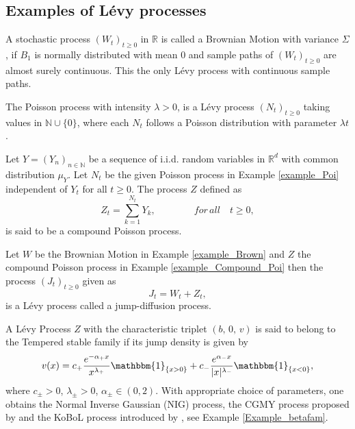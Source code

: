 \subsection{Examples of L\'evy processes}
\begin{example}\label{example_Brown}
A stochastic process $(W_t)_{t \geq 0}$ in $\mathbb{R}$ is called a Brownian Motion with variance $\Sigma$, if $B_1$ is normally distributed with mean 0 and sample paths of  $(W_t)_{t \geq 0}$ are almost surely continuous. This the only L\'evy process with continuous sample paths.
\end{example}
\begin{example}\label{example_Poi}
The Poisson process with intensity $\lambda > 0$, is a L\'evy process  $(N_t)_{t \geq 0}$ taking values in $\mathbb{N} \cup \{0\}$, where each $N_t$ follows a Poisson distribution with parameter $\lambda t$.
\end{example}
\begin{example}\label{example_Compound_Poi} 
Let $Y = (Y_n)_{n \in \mathbb{N}}$ be a sequence of i.i.d. random variables in $\mathbb{R}^d$ with common distribution $\mu_Y$. Let $N_t$ be the given Poisson process in Example \ref{example_Poi} independent of $Y_t$ for all $t \geq 0$. The process $Z$ defined as
\begin{equation*}
    Z_t = \sum_{k=1}^{N_t} Y_k, \qquad \qquad for \, all \quad t \geq 0,
\end{equation*}
is said to be a compound Poisson process.
\end{example}
\begin{example}
Let $W$ be the Brownian Motion in Example \ref{example_Brown} and $Z$ the compound Poisson process in  Example \ref{example_Compound_Poi} then the process $(J_t)_{t \geq 0}$ given as 
\begin{equation}
    J_t = W_t +  Z_t,
\end{equation}
is a L\'evy process called a jump-diffusion process.
\end{example}
\begin{example} A L\'evy Process $Z$ with the characteristic triplet $(b, \, 0 ,\, v)$ is said to belong to the Tempered stable family if its jump density is given by
\begin{equation}\label{eq_tempered}
    v(x) = c_+ \dfrac{e^{-\alpha_+ x}}{x^{\lambda_+}}\mathbbm{1}_{\{x > 0\}} + c_- \dfrac{e^{\alpha_- x}}{|x|^{\lambda_-}} \mathbbm{1}_{\{x < 0\}},
\end{equation}
where $c_{\pm} > 0$, $\lambda_{\pm} > 0$, $\alpha_{\pm} \in (0, 2)$. With appropriate choice of parameters, one obtains the Normal Inverse Gaussian (NIG) process, the CGMY process proposed by  and the KoBoL process introduced by , see Example \ref{Example_betafam}.
\end{example}
